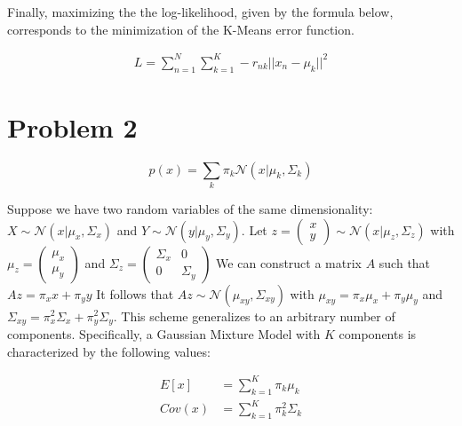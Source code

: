 \documentclass[12pt]{article}
\begin{document}
Finally, maximizing the the log-likelihood, given by the formula below, corresponds to the minimization of the K-Means error function.

\begin{equation}
 \begin{align}
  L = \sum_{n=1}^{N} \sum_{k=1}^{K} -r_{nk} ||x_n - \mu_k||^2
 \end{align}
\end{equation}

\section*{Problem 2}

\begin{equation}
 p(x) = \sum_k \pi_k \mathcal{N}(x|\mu_k, \Sigma_k)
\end{equation}

Suppose we have two random variables of the same dimensionality: $X \sim \mathcal{N}(x|\mu_x, \Sigma_x)$ and $Y \sim \mathcal{N}(y|\mu_y, \Sigma_y)$. Let $z = \begin{pmatrix} x \\ y \end{pmatrix} \sim \mathcal{N}(x|\mu_z, \Sigma_z)$ with $\mu_z = \begin{pmatrix} \mu_x \\ \mu_y \end{pmatrix}$ and $\Sigma_z = \begin{pmatrix} \Sigma_x & 0 \\ 0 & \Sigma_y \end{pmatrix}$ We can construct a matrix $A$ such that $Az = \pi_x x + \pi_y y$ It follows that $Az \sim \mathcal{N}(\mu_{xy}, \Sigma_{xy})$ with $\mu_{xy} = \pi_x \mu_x + \pi_y \mu_y$ and  $\Sigma_{xy} = \pi_x^2 \Sigma_x + \pi_y^2 \Sigma_y$. This scheme generalizes to an arbitrary number of components. Specifically, a Gaussian Mixture Model with $K$ components is characterized by the following values:

\begin{equation}
  \begin{align}	
    E[x] &= \sum_{k=1}^K \pi_k \mu_k \\
    Cov(x) &= \sum_{k=1}^K \pi_k^2 \Sigma_k
  \end{align}
\end{equation}
\end{document}
